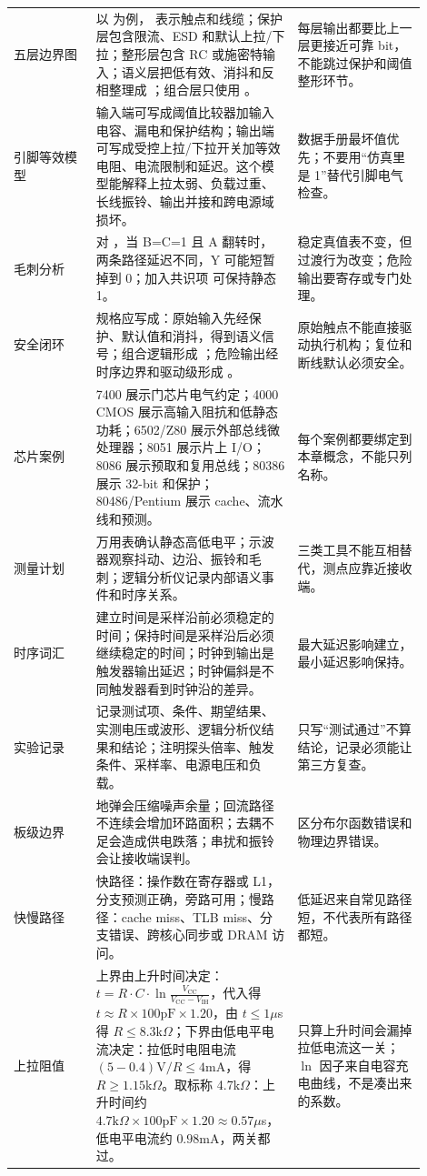 \begin{longtable}{L{0.18\linewidth}L{0.44\linewidth}L{0.28\linewidth}}
五层边界图 & 以  为例， 表示触点和线缆；保护层包含限流、ESD 和默认上拉/下拉；整形层包含 RC 或施密特输入；语义层把低有效、消抖和反相整理成 ；组合层只使用 。 & 每层输出都要比上一层更接近可靠 bit，不能跳过保护和阈值整形环节。 \\
引脚等效模型 & 输入端可写成阈值比较器加输入电容、漏电和保护结构；输出端可写成受控上拉/下拉开关加等效电阻、电流限制和延迟。这个模型能解释上拉太弱、负载过重、长线振铃、输出并接和跨电源域损坏。 & 数据手册最坏值优先；不要用“仿真里是 1”替代引脚电气检查。 \\
毛刺分析 & 对 ，当 B=C=1 且 A 翻转时，两条路径延迟不同，Y 可能短暂掉到 0；加入共识项  可保持静态 1。 & 稳定真值表不变，但过渡行为改变；危险输出要寄存或专门处理。 \\
安全闭环 & 规格应写成：原始输入先经保护、默认值和消抖，得到语义信号；组合逻辑形成 ；危险输出经时序边界和驱动级形成 。 & 原始触点不能直接驱动执行机构；复位和断线默认必须安全。 \\
芯片案例 & 7400 展示门芯片电气约定；4000 CMOS 展示高输入阻抗和低静态功耗；6502/Z80 展示外部总线微处理器；8051 展示片上 I/O；8086 展示预取和复用总线；80386 展示 32-bit 和保护；80486/Pentium 展示 cache、流水线和预测。 & 每个案例都要绑定到本章概念，不能只列名称。 \\
测量计划 & 万用表确认静态高低电平；示波器观察抖动、边沿、振铃和毛刺；逻辑分析仪记录内部语义事件和时序关系。 & 三类工具不能互相替代，测点应靠近接收端。 \\
时序词汇 & 建立时间是采样沿前必须稳定的时间；保持时间是采样沿后必须继续稳定的时间；时钟到输出是触发器输出延迟；时钟偏斜是不同触发器看到时钟沿的差异。 & 最大延迟影响建立，最小延迟影响保持。 \\
实验记录 & 记录测试项、条件、期望结果、实测电压或波形、逻辑分析仪结果和结论；注明探头倍率、触发条件、采样率、电源电压和负载。 & 只写“测试通过”不算结论，记录必须能让第三方复查。 \\
板级边界 & 地弹会压缩噪声余量；回流路径不连续会增加环路面积；去耦不足会造成供电跌落；串扰和振铃会让接收端误判。 & 区分布尔函数错误和物理边界错误。 \\
快慢路径 & 快路径：操作数在寄存器或 L1，分支预测正确，旁路可用；慢路径：cache miss、TLB miss、分支错误、跨核心同步或 DRAM 访问。 & 低延迟来自常见路径短，不代表所有路径都短。 \\
上拉阻值 & 上界由上升时间决定：$t=R\cdot C\cdot\ln\frac{V_\mathrm{CC}}{V_\mathrm{CC}-V_\mathrm{IH}}$，代入得 $t\approx R\times100\mathrm{pF}\times1.20$，由 $t\le1\mu$s 得 $R\le8.3$k$\Omega$；下界由低电平电流决定：拉低时电阻电流 $(5-0.4)\mathrm{V}/R\le4$mA，得 $R\ge1.15$k$\Omega$。取标称 4.7k$\Omega$：上升时间约 $4.7\mathrm{k}\Omega\times100\mathrm{pF}\times1.20\approx0.57\mu$s，低电平电流约 $0.98$mA，两关都过。 & 只算上升时间会漏掉拉低电流这一关；$\ln$ 因子来自电容充电曲线，不是凑出来的系数。 \\

\end{longtable}
